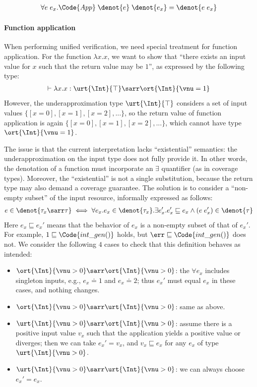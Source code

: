 \begin{theorem}
  \begin{align*}
    \forall e\;e_x. \Code{App}\;\denot{e}\;\denot{e_x} = \denot{e\;e_x}
  \end{align*}\noindent
\end{theorem}

\paragraph{Function application} When performing unified verification, we need special treatment for function application. For the function $\lambda x.x$, we want to show that ``there exists an input value for $x$ such that the return value may be $1$'', as expressed by the following type:
\begin{align*}
  \vdash \lambda x.x : \urt{\Int}{\top} \sarr \ort{\Int}{\vnu = 1}
\end{align*}\noindent
However, the underapproximation type $\urt{\Int}{\top}$ considers a set of input values $\{[x = 0], [x = 1], [x = 2], ...\}$, so the return value of function application is again $\{[x = 0], [x = 1], [x = 2], ...\}$, which cannot have type $\ort{\Int}{\vnu = 1}$. 

The issue is that the current interpretation lacks ``existential'' semantics: the underapproximation on the input type does not fully provide it. In other words, the denotation of a function must incorporate an $\exists$ quantifier (as in coverage types). Moreover, the ``existential'' is not a single substitution, because the return type may also demand a coverage guarantee. The solution is to consider a ``non-empty subset'' of the input resource, informally expressed as follows:
\begin{align*}
  e \in \denot{\tau_x \sarr \tau} \iff \forall e_x. e_x \in \denot{\tau_x}. \exists e_x'. e_x' \sqsubseteq e_x \land (e\;e_x') \in \denot{\tau}
\end{align*}\noindent
Here $e_x \sqsubseteq e_x'$ means that the behavior of $e_x$ is a non-empty subset of that of $e_x'$. 
For example, $1 \sqsubseteq \Code{int\_gen()}$ holds, but $\err \sqsubseteq \Code{int\_gen()}$ does not. We consider the following $4$ cases to check that this definition behaves as intended:
\begin{itemize}
  \item $\ort{\Int}{\vnu > 0} \sarr \ort{\Int}{\vnu > 0}$: the $\forall e_x$ includes singleton inputs, e.g., $e_x \doteq 1$ and $e_x \doteq 2$; thus $e_x'$ must equal $e_x$ in these cases, and nothing changes.
  \item $\ort{\Int}{\vnu > 0} \sarr \urt{\Int}{\vnu > 0}$: same as above.
  \item $\urt{\Int}{\vnu > 0} \sarr \ort{\Int}{\vnu > 0}$: assume there is a positive input value $v_x$ such that the application yields a positive value or diverges; then we can take $e_x' = v_x$, and $v_x \sqsubseteq e_x$ for any $e_x$ of type $\urt{\Int}{\vnu > 0}$.
  \item $\urt{\Int}{\vnu > 0} \sarr \urt{\Int}{\vnu > 0}$: we can always choose $e_x' = e_x$.
\end{itemize}

